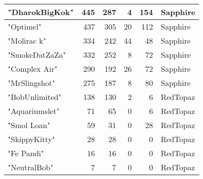 \documentclass{article}
\begin{document}
\begin{table}[htbp]
\begin{tabular}{|l|r|r|r|r|l|}
"DharokBigKok" & 445 & 287 & 4 & 154 & Sapphire \\ \hline
"Optimel" & 437 & 305 & 20 & 112 & Sapphire \\ \hline
"Molirac k" & 334 & 242 & 44 & 48 & Sapphire \\ \hline
"SmokeDatZaZa" & 332 & 252 & 8 & 72 & Sapphire \\ \hline
"Complex Air" & 290 & 192 & 26 & 72 & Sapphire \\ \hline
"MrSlingshot" & 275 & 187 & 8 & 80 & Sapphire \\ \hline
"BobUnlimited" & 138 & 130 & 2 & 6 & RedTopaz \\ \hline
"Aquariumslet" & 71 & 65 & 0 & 6 & RedTopaz \\ \hline
"Smol Loan" & 59 & 31 & 0 & 28 & RedTopaz \\ \hline
"SkippyKitty" & 28 & 28 & 0 & 0 & RedTopaz \\ \hline
"Fe Pandi" & 16 & 16 & 0 & 0 & RedTopaz \\ \hline
"NeutralBob" & 7 & 7 & 0 & 0 & RedTopaz \\ \hline
\end{tabular}
\end{table}
\end{document}
